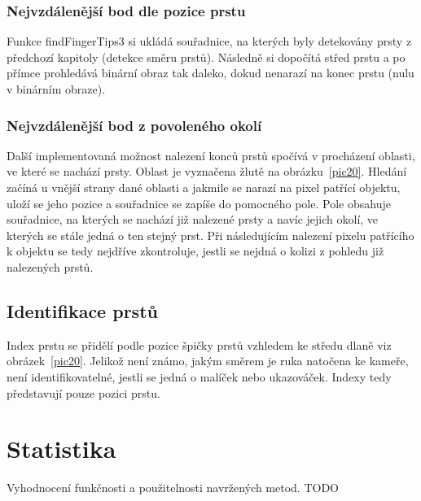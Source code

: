 \subsubsection{Nejvzdálenější bod dle pozice prstu}
Funkce findFingerTips3 si ukládá souřadnice, na kterých byly detekovány prsty z předchozí kapitoly (detekce směru prstů). Následně si dopočítá střed prstu a po přímce prohledává binární obraz tak daleko, dokud nenarazí na konec prstu (nulu v binárním obraze). 

\subsubsection{Nejvzdálenější bod z povoleného okolí}
Další implementovaná možnost nalezení konců prstů spočívá v procházení oblasti, ve které se nachází prsty. Oblast je vyznačena žlutě na obrázku~\ref{pic20}. Hledání začíná u vnější strany dané oblasti a jakmile se narazí na pixel patřící objektu, uloží se jeho pozice a souřadnice se zapíše do pomocného pole. Pole obsahuje souřadnice, na kterých se nachází již nalezené prsty a navíc jejich okolí, ve kterých se stále jedná o ten stejný prst. Při následujícím nalezení pixelu patřícího k objektu se tedy nejdříve zkontroluje, jestli se nejdná o kolizi z pohledu již nalezených prstů.

\subsection{Identifikace prstů}
Index prstu se přidělí podle pozice špičky prstů vzhledem ke středu dlaně viz obrázek~\ref{pic20}. Jelikož není známo, jakým směrem je ruka natočena ke kameře, není identifikovatelné, jestli se jedná o malíček nebo ukazováček. Indexy tedy představují pouze pozici prstu.

\section{Statistika}
Vyhodnocení funkčnosti a použitelnosti navržených metod.
TODO

\endinput
